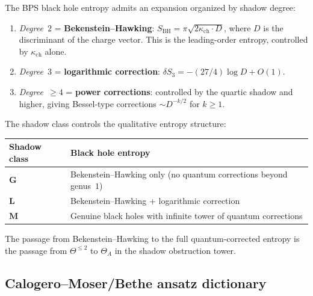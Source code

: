 \documentclass[11pt]{article}
\begin{document}
\begin{proposition}
\label{prop:bps-entropy}
The BPS black hole entropy admits an expansion organized by shadow degree:
\begin{enumerate}[label=\textup{(\roman*)}]
 \item \emph{Degree~$2$} = \textbf{Bekenstein--Hawking}: $S_{\mathrm{BH}} = \pi\sqrt{2\kappa_{\mathrm{ch}} \cdot D}$, where $D$ is the discriminant of the charge vector. This is the leading-order entropy, controlled by $\kappa_{\mathrm{ch}}$ alone.
 \item \emph{Degree~$3$} = \textbf{logarithmic correction}: $\delta S_3 = -(27/4) \log D + O(1)$.
 \item \emph{Degree~$\geq 4$} = \textbf{power corrections}: controlled by the quartic shadow and higher, giving Bessel-type corrections $\sim D^{-k/2}$ for $k \geq 1$.
\end{enumerate}
The shadow class controls the qualitative entropy structure:
\begin{center}
\renewcommand{\arraystretch}{1.2}
\begin{tabular}{ll}
 \toprule
 \textbf{Shadow class} & \textbf{Black hole entropy} \\
 \midrule
 $\mathbf{G}$ & Bekenstein--Hawking only (no quantum corrections beyond genus~$1$) \\
 $\mathbf{L}$ & Bekenstein--Hawking + logarithmic correction \\
 $\mathbf{M}$ & Genuine black holes with infinite tower of quantum corrections \\
 \bottomrule
\end{tabular}
\end{center}
The passage from Bekenstein--Hawking to the full quantum-corrected entropy is the passage from $\Theta^{\leq 2}$ to $\Theta_A$ in the shadow obstruction tower.
\end{proposition}

\subsection{Calogero--Moser/Bethe ansatz dictionary}
\label{subsec:calogero-bethe}
\end{document}
